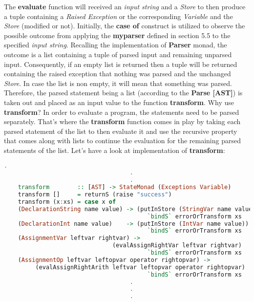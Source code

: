\documentclass[a4paper, onecolumn]{article}
\begin{document}
    \noindent The \textbf{evaluate} function will received an \textit{input string} and a \textit{Store} to then produce a tuple containing a \textit{Raised Exception} or the corresponding \textit{Variable} and the \textit{Store} (modified or not). Initially, the \textbf{case of} construct is utilized to observe the possible outcome from applying the \textbf{my\textunderscore parser} defined in section 5.5 to the specified \textit{input string}. Recalling the implementation of \textbf{Parser} monad, the outcome is a list containing a tuple of parsed input and remaining unparsed input. Consequently, if an empty list is returned then a tuple will be returned containing the raised exception that nothing was parsed and the unchanged \textit{Store}. In case the list is non empty, it will mean that something was parsed. Therefore, the parsed statement being a list (according to the \textbf{Parse [AST]}) is taken out and placed as an input value to the function \textbf{transform}. Why use \textbf{transform}? In order to evaluate a program, the statements need to be parsed separately. That's where the \textbf{transform} function comes in play by taking each parsed statement of the list to then evaluate it and use the recursive property that comes along with lists to continue the evaluation for the remaining parsed statements of the list. Let's have a look at implementation of \textbf{transform}:
    
    \begin{tcolorbox}
    \begin{lstlisting}[language=Haskell]
                                    .
                                    .
                                    .
    transform        :: [AST] -> StateMonad (Exceptions Variable) 
    transform []     = returnS (raise "success")
    transform (x:xs) = case x of 
    (DeclarationString name value) -> (putInStore (StringVar name value))
                                         `bindS` errorOrTransform xs
    (DeclarationInt name value)    -> (putInStore (IntVar name value))
                                         `bindS` errorOrTransform xs
    (AssignmentVar leftvar rightvar) -> 
                               (evalAssignRightVar leftvar rightvar)
                                         `bindS` errorOrTransform xs
    (AssignmentOp leftvar leftopvar operator rightopvar) ->
         (evalAssignRightArith leftvar leftopvar operator rightopvar) 
                                         `bindS` errorOrTransform xs
                                    .
                                    .
                                    .
    \end{lstlisting}
    \end{tcolorbox}
    
\end{document}
